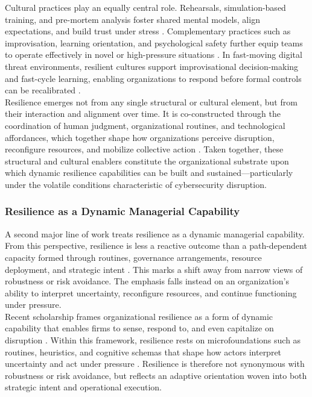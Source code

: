 Cultural practices play an equally central role. Rehearsals, simulation-based training, and pre-mortem analysis foster shared mental models, align expectations, and build trust under stress \autocite{klein2008performing, weick2011managing, westrum2004typology}. Complementary practices such as improvisation, learning orientation, and psychological safety further equip teams to operate effectively in novel or high-pressure situations \autocite{vogus2007organizational, lanzara1999transient}. In fast-moving digital threat environments, resilient cultures support improvisational decision-making and fast-cycle learning, enabling organizations to respond before formal controls can be recalibrated \autocite{duchek2020organizational, westrum2004typology}.\\

Resilience emerges not from any single structural or cultural element, but from their interaction and alignment over time. It is co-constructed through the coordination of human judgment, organizational routines, and technological affordances, which together shape how organizations perceive disruption, reconfigure resources, and mobilize collective action \autocite{henfridsson2013generative, vogus2007organizational, lengnick2011developing}. Taken together, these structural and cultural enablers constitute the organizational substrate upon which dynamic resilience capabilities can be built and sustained—particularly under the volatile conditions characteristic of cybersecurity disruption.

\subsubsection{Resilience as a Dynamic Managerial Capability}

A second major line of work treats resilience as a dynamic managerial capability. From this perspective, resilience is less a reactive outcome than a path-dependent capacity formed through routines, governance arrangements, resource deployment, and strategic intent \autocite{lengnick2011developing,boin2013resilient}. This marks a shift away from narrow views of robustness or risk avoidance. The emphasis falls instead on an organization's ability to interpret uncertainty, reconfigure resources, and continue functioning under pressure.\\

Recent scholarship frames organizational resilience as a form of dynamic capability that enables firms to sense, respond to, and even capitalize on disruption \autocite{teece2007explicating, duchek2020organizational}. Within this framework, resilience rests on microfoundations such as routines, heuristics, and cognitive schemas that shape how actors interpret uncertainty and act under pressure \autocite{hepfer2022heterogeneity}. Resilience is therefore not synonymous with robustness or risk avoidance, but reflects an adaptive orientation woven into both strategic intent and operational execution.\\

